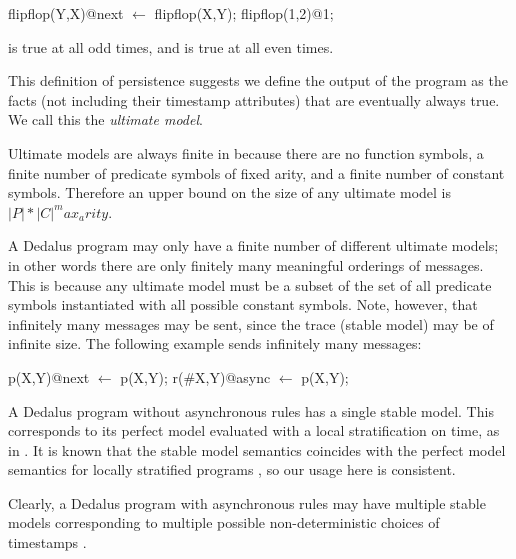 \begin{example}
\begin{Dedalus}
flipflop(Y,X)@next \(\leftarrow\) flipflop(X,Y);
flipflop(1,2)@1;
\end{Dedalus}
\end{example}

 is true at all odd times, and  is true at all even times.

This definition of persistence suggests we define the output of the program as the facts (not including their timestamp attributes) that are eventually always true.  We call this the {\em ultimate model}.

Ultimate models are always finite in \dedalus because there are no function symbols, a finite number of predicate symbols of fixed arity, and a finite number of constant symbols.  Therefore an upper bound on the size of any ultimate model is $|P| * |C| ^ max_arity$.

A Dedalus program may only have a finite number of different ultimate models; in other words there are only finitely many meaningful orderings of messages.  This is because any ultimate model must be a subset of the set of all predicate symbols instantiated with all possible constant symbols.  Note, however, that infinitely many messages may be sent, since the trace (stable model) may be of infinite size.  The following example sends infinitely many messages:

\begin{example}
\begin{Dedalus}
p(X,Y)@next \(\leftarrow\) p(X,Y);
r(#X,Y)@async \(\leftarrow\) p(X,Y);
\end{Dedalus}
\end{example}

A Dedalus program without asynchronous rules has a single stable model.  This corresponds to its perfect model evaluated with a local stratification on time, as in .  It is known that the stable model semantics coincides with the perfect model semantics for locally stratified programs , so our usage here is consistent.

Clearly, a Dedalus program with asynchronous rules may have multiple stable models corresponding to multiple possible non-deterministic choices of timestamps .


